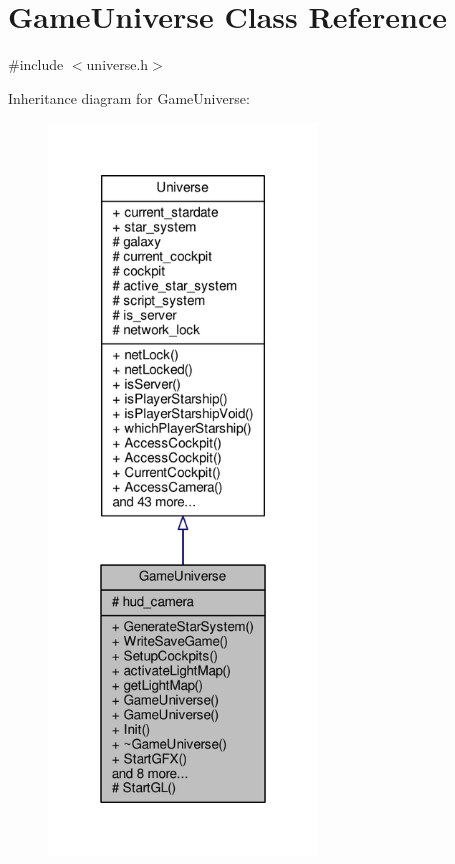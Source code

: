 \hypertarget{classGameUniverse}{}\section{Game\+Universe Class Reference}
\label{classGameUniverse}


{\ttfamily \#include $<$universe.\+h$>$}



Inheritance diagram for Game\+Universe\+:
\nopagebreak
\begin{figure}[H]
\begin{center}
\leavevmode
\includegraphics[height=550pt]{d7/deb/classGameUniverse__inherit__graph}
\end{center}
\end{figure}


